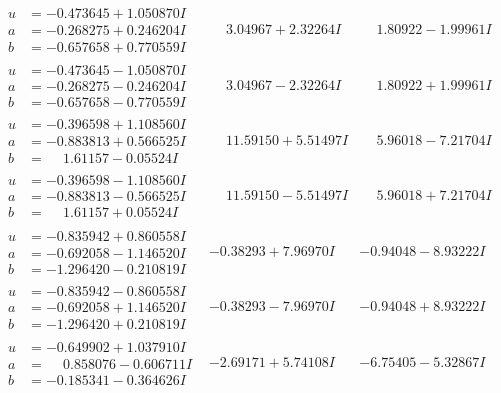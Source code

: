 \documentclass[1p]{elsarticle_modified}
\theoremstyle{definition}
\begin{document}
$$\begin{array}{c|c|c}
\begin{aligned}
u &= -0.473645 + 1.050870 I \\
a &= -0.268275 + 0.246204 I \\
b &= -0.657658 + 0.770559 I\end{aligned}
 & \phantom{-}3.04967 + 2.32264 I & \phantom{-}1.80922 - 1.99961 I \\ \hline\begin{aligned}
u &= -0.473645 - 1.050870 I \\
a &= -0.268275 - 0.246204 I \\
b &= -0.657658 - 0.770559 I\end{aligned}
 & \phantom{-}3.04967 - 2.32264 I & \phantom{-}1.80922 + 1.99961 I \\ \hline\begin{aligned}
u &= -0.396598 + 1.108560 I \\
a &= -0.883813 + 0.566525 I \\
b &= \phantom{-}1.61157 - 0.05524 I\end{aligned}
 & \phantom{-}11.59150 + 5.51497 I & \phantom{-}5.96018 - 7.21704 I \\ \hline\begin{aligned}
u &= -0.396598 - 1.108560 I \\
a &= -0.883813 - 0.566525 I \\
b &= \phantom{-}1.61157 + 0.05524 I\end{aligned}
 & \phantom{-}11.59150 - 5.51497 I & \phantom{-}5.96018 + 7.21704 I \\ \hline\begin{aligned}
u &= -0.835942 + 0.860558 I \\
a &= -0.692058 - 1.146520 I \\
b &= -1.296420 - 0.210819 I\end{aligned}
 & -0.38293 + 7.96970 I & -0.94048 - 8.93222 I \\ \hline\begin{aligned}
u &= -0.835942 - 0.860558 I \\
a &= -0.692058 + 1.146520 I \\
b &= -1.296420 + 0.210819 I\end{aligned}
 & -0.38293 - 7.96970 I & -0.94048 + 8.93222 I \\ \hline\begin{aligned}
u &= -0.649902 + 1.037910 I \\
a &= \phantom{-}0.858076 - 0.606711 I \\
b &= -0.185341 - 0.364626 I\end{aligned}
 & -2.69171 + 5.74108 I & -6.75405 - 5.32867 I \\ \hline\begin{aligned}

\end{aligned}
\end{array}$$
\end{document}
